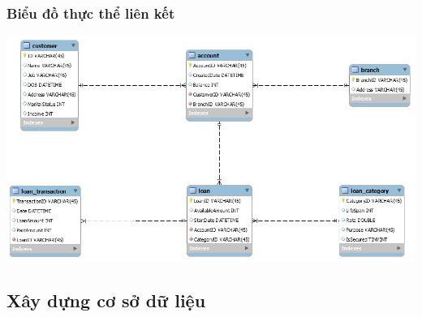 \documentclass{article}
\begin{document}
\subsubsection{Biểu đồ thực thể liên kết}
\begin{center}
    \includegraphics[scale=0.25]{DBDiagram.png}
\end{center}
\subsection{Xây dựng cơ sở dữ liệu}
\end{document}
